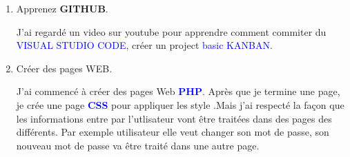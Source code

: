\documentclass{article}
\begin{document}
\begin{enumerate}
\begin{enumerate}
\hspace*{-1.05in}
               \noindent{}         
         \vspace{1cm}
         \item \textcolor{amethyst}{Apprenez \textbf{GITHUB}}.
         
         \vspace{0.4cm}
                \setlength{\parindent}{1cm} J'ai regardé un video sur youtube pour apprendre comment commiter du \textcolor{blue}{VISUAL STUDIO CODE}, créer un project \textcolor{blue}{basic KANBAN}.
         
         \item \textcolor{amethyst}{Créer des pages WEB}.
         
         \vspace{0.4cm}
                \setlength{\parindent}{1cm} J'ai commencé à créer des pages Web \textcolor{blue}{\textbf{PHP}}. Après que je termine une page, je crée une page \textcolor{blue}{\textbf{CSS}} pour appliquer les style .Mais j'ai respecté la façon que les informations entre par l'utlisateur vont  être traitées dans des pages des différents. Par exemple utilisateur elle veut changer son mot de passe, son nouveau mot de passe va être traité dans une autre page.
         

\end{enumerate}
\end{enumerate}
\end{document}
